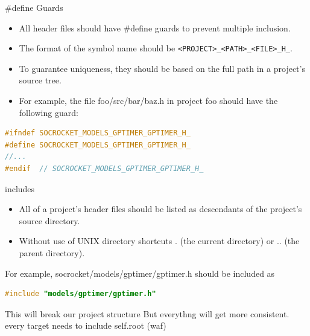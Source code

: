 \documentclass[fleqn,11pt,aspectratio=43]{beamer}
\begin{document}
\begin{frame}[fragile]{\#define Guards}
\begin{itemize}
  \item All header files should have \#define guards to prevent multiple inclusion.
  \item The format of the symbol name should be {\tt <PROJECT>\_<PATH>\_<FILE>\_H\_}.
  \item To guarantee uniqueness, they should be based on the full path in a project's source tree. 
  \item For example, the file foo/src/bar/baz.h in project foo should have the following guard:
\end{itemize}

\begin{lstlisting}[language=c]
#ifndef SOCROCKET_MODELS_GPTIMER_GPTIMER_H_
#define SOCROCKET_MODELS_GPTIMER_GPTIMER_H_
//...
#endif  // SOCROCKET_MODELS_GPTIMER_GPTIMER_H_
\end{lstlisting}
\end{frame}

\begin{frame}[fragile]{includes}
  \begin{itemize}
    \item All of a project's header files should be listed as descendants of the project's source directory.
    \item Without use of UNIX directory shortcuts . (the current directory) or .. (the parent directory). 
  \end{itemize}

For example, socrocket/models/gptimer/gptimer.h should be included as

\begin{lstlisting}[language=c]
#include "models/gptimer/gptimer.h"
\end{lstlisting}

  \begin{alertblock}{This will break our project structure}
    But everythng will get more consistent. \\
    every target needs to include self.root (waf)
  \end{alertblock}
\end{frame}
\end{document}
